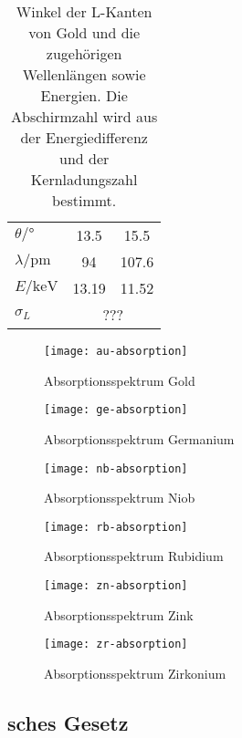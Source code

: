 \begin{table}
  \centering
  \begin{tabular}{lSS}
    \toprule
    $\theta/\si{\degree}$ &13.5 & 15.5 \\
    $\lambda/\si{\pico\metre}$ & 94 & 107.6\\
    $E/\si{\kilo\electronvolt}$ & 13.19 & 11.52\\
    \midrule
    $\sigma_L$ &  \\
    \bottomrule
  \end{tabular}
  \caption{Winkel der L-Kanten von Gold und die zugehörigen
    Wellenlängen sowie Energien. Die Abschirmzahl wird aus der
    Energiedifferenz und der Kernladungszahl bestimmt.}
  \label{tab:gold-absorption}
\end{table}

\begin{figure}
  \centering
  \texttt{[image: au-absorption]}
  \caption{Absorptionsspektrum Gold}
  \label{fig:au-absorption}
\end{figure}

\begin{figure}
  \centering
  \texttt{[image: ge-absorption]}
  \caption{Absorptionsspektrum Germanium}
\end{figure}

\begin{figure}
  \centering
  \texttt{[image: nb-absorption]}
  \caption{Absorptionsspektrum Niob}
\end{figure}

\begin{figure}
  \centering
  \texttt{[image: rb-absorption]}
  \caption{Absorptionsspektrum Rubidium}
\end{figure}

\begin{figure}
  \centering
  \texttt{[image: zn-absorption]}
  \caption{Absorptionsspektrum Zink}
\end{figure}

\begin{figure}
  \centering
  \texttt{[image: zr-absorption]}
  \caption{Absorptionsspektrum Zirkonium}
  \label{fig:zr-absorption}
\end{figure}

\subsection{sches Gesetz}

